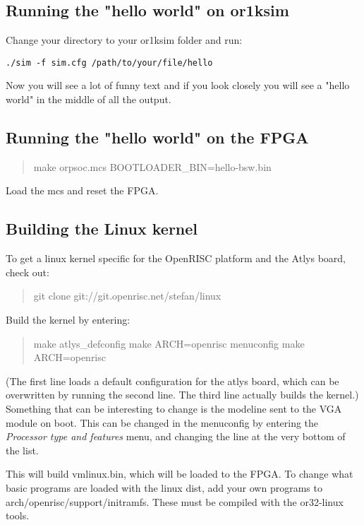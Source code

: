 \documentclass[10pt,a4paper]{article}
\begin{document}
\subsection{Running the "hello world" on or1ksim}
Change your directory to your or1ksim folder and run:
\begin{lstlisting}
./sim -f sim.cfg /path/to/your/file/hello
\end{lstlisting}
Now you will see a lot of funny text and if you look closely you will see a "hello world" in the middle of all the output.

\subsection{Running the "hello world" on the FPGA}
\begin{quote}
make orpsoc.mcs BOOTLOADER\_BIN=hello-bsw.bin
\end{quote}

Load the mcs and reset the FPGA.

\subsection{Building the Linux kernel}
To get a linux kernel specific for the OpenRISC platform and the Atlys board, check out:

\begin{quote}
git clone git://git.openrisc.net/stefan/linux
\end{quote}

Build the kernel by entering:

\begin{quote}
make atlys\_defconfig \newline
make ARCH=openrisc menuconfig \newline
make ARCH=openrisc
\end{quote}

(The first line loads a default configuration for the atlys board, which can be overwritten by running the second line. The third line actually builds the kernel.) Something that can be interesting to change is the modeline sent to the VGA module on boot. This can be changed in the menuconfig by entering the \textit{Processor type and features} menu, and changing the line at the very bottom of the list.

This will build vmlinux.bin, which will be loaded to the FPGA. To change what basic programs are loaded with the linux dist, add your own programs to arch/openrisc/support/initramfs. These must be compiled with the or32-linux tools.
\end{document}

